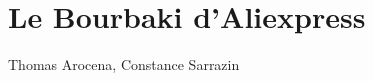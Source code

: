 \documentclass{article}
\begin{document}
\part*{Le Bourbaki d'Aliexpress}
Thomas Arocena, Constance Sarrazin
\tableofcontents
\pagebreak

\end{document}
